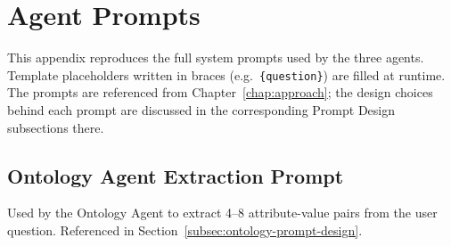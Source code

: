 \chapter{Agent Prompts}\label{app:prompts}

This appendix reproduces the full system prompts used by the three agents.
Template placeholders written in braces (e.g.\ \texttt{\{question\}}) are filled at
runtime. The prompts are referenced from Chapter~\ref{chap:approach}; the design
choices behind each prompt are discussed in the corresponding Prompt Design
subsections there.

\section{Ontology Agent Extraction Prompt}\label{app:prompt-ontology}

Used by the Ontology Agent to extract 4--8 attribute-value pairs from the user question.
Referenced in Section~\ref{subsec:ontology-prompt-design}.

